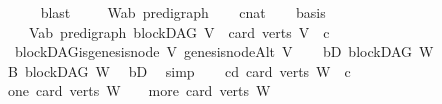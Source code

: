 \begin{isabellebody}
\ \ \ \ \isamarkupfalse%
\ blast\ \isanewline
{}\isamarkupfalse%
\isanewline
\ \ \isamarkupfalse%
\ W{\isacharcolon}{\kern0pt}{\isacharcolon}{\kern0pt}{\isachardoublequoteopen}{\isacharparenleft}{\kern0pt}{\isacharprime}{\kern0pt}a{\isacharcomma}{\kern0pt}{\isacharprime}{\kern0pt}b{\isacharparenright}{\kern0pt}\ pre{\isacharunderscore}{\kern0pt}digraph{\isachardoublequoteclose}\isanewline
\ \ \isamarkupfalse%
\ c{\isacharcolon}{\kern0pt}{\isacharcolon}{\kern0pt}nat\isanewline
\ \ \isamarkupfalse%
\ basis{\isacharcolon}{\kern0pt}\ \isanewline
\ \ \ \ {\isachardoublequoteopen}{\isacharparenleft}{\kern0pt}{\isasymAnd}V{\isacharcolon}{\kern0pt}{\isacharcolon}{\kern0pt}{\isacharparenleft}{\kern0pt}{\isacharprime}{\kern0pt}a{\isacharcomma}{\kern0pt}{\isacharprime}{\kern0pt}b{\isacharparenright}{\kern0pt}\ pre{\isacharunderscore}{\kern0pt}digraph{\isachardot}{\kern0pt}\ blockDAG\ V\ {\isasymLongrightarrow}\ card\ {\isacharparenleft}{\kern0pt}verts\ V{\isacharparenright}{\kern0pt}\ {\isacharless}{\kern0pt}\ c\ {\isasymLongrightarrow}\ \isanewline
\ \ blockDAG{\isachardot}{\kern0pt}is{\isacharunderscore}{\kern0pt}genesis{\isacharunderscore}{\kern0pt}node\ V\ {\isacharparenleft}{\kern0pt}genesis{\isacharunderscore}{\kern0pt}nodeAlt\ V{\isacharparenright}{\kern0pt}{\isacharparenright}{\kern0pt}{\isachardoublequoteclose}\isanewline
\ \ \isamarkupfalse%
\ bD{\isacharcolon}{\kern0pt}\ {\isachardoublequoteopen}blockDAG\ W{\isachardoublequoteclose}\isanewline
\ \ \isamarkupfalse%
\ B{\isacharcolon}{\kern0pt}\ blockDAG\ {\isachardoublequoteopen}W{\isachardoublequoteclose}\ \isamarkupfalse%
\ bD\ \isamarkupfalse%
\ simp\isanewline
\ \ \isamarkupfalse%
\ cd{\isacharcolon}{\kern0pt}\ {\isachardoublequoteopen}card\ {\isacharparenleft}{\kern0pt}verts\ W{\isacharparenright}{\kern0pt}\ {\isacharequal}{\kern0pt}\ c{\isachardoublequoteclose}\ \isanewline
\ \ \isamarkupfalse%
\ {\isacharparenleft}{\kern0pt}one{\isacharparenright}{\kern0pt}\ {\isachardoublequoteopen}card\ {\isacharparenleft}{\kern0pt}verts\ W{\isacharparenright}{\kern0pt}\ {\isacharequal}{\kern0pt}\ {}{\isachardoublequoteclose}\ {\isacharbar}{\kern0pt}\ {\isacharparenleft}{\kern0pt}more{\isacharparenright}{\kern0pt}\ {\isachardoublequoteopen}card\ {\isacharparenleft}{\kern0pt}verts\ W{\isacharparenright}{\kern0pt}\ {\isachargreater}{\kern0pt}\ {}{\isachardoublequoteclose}\isanewline
\ \ \ \ \isamarkupfalse%

\end{isabellebody}
